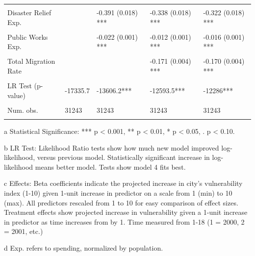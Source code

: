 \documentclass[]{elsarticle} %
\begin{document}
\begin{table}
\begin{threeparttable}
\begin{tabular}[t]{lllll}
\addlinespace
\cellcolor{gray!6}{Financial Strength} & \cellcolor{gray!6}{} & \cellcolor{gray!6}{0.084 (0.002) ***} & \cellcolor{gray!6}{0.090 (0.002) ***} & \cellcolor{gray!6}{0.089 (0.003) ***}\\
Disaster Relief Exp. &  & -0.391 (0.018) *** & -0.338 (0.018) *** & -0.322 (0.018) ***\\
\cellcolor{gray!6}{Emergency Services Exp.} & \cellcolor{gray!6}{} & \cellcolor{gray!6}{-0.040 (0.001) ***} & \cellcolor{gray!6}{-0.045 (0.001) ***} & \cellcolor{gray!6}{-0.044 (0.001) ***}\\
Public Works Exp. &  & -0.022 (0.001) *** & -0.012 (0.001) *** & -0.016 (0.001) ***\\
\cellcolor{gray!6}{Disaster Conditions} & \cellcolor{gray!6}{} & \cellcolor{gray!6}{} & \cellcolor{gray!6}{0.042 (0.008) ***} & \cellcolor{gray!6}{0.051 (0.008) ***}\\
\addlinespace
Total Migration Rate &  &  & -0.171 (0.004) *** & -0.170 (0.004) ***\\
\cellcolor{gray!6}{Constant} & \cellcolor{gray!6}{6.223 (0.047) ***} & \cellcolor{gray!6}{7.256 (0.047) ***} & \cellcolor{gray!6}{7.458 (0.046) ***} & \cellcolor{gray!6}{7.572 (0.046) ***}\\
\midrule
LR Test (p-value) & -17335.7 & -13606.2*** & -12593.5*** & -12286***\\
\cellcolor{gray!6}{R2} & \cellcolor{gray!6}{0.141} & \cellcolor{gray!6}{0.323} & \cellcolor{gray!6}{0.366} & \cellcolor{gray!6}{0.378}\\
Num. obs. & 31243 & 31243 & 31243 & 31243\\
\addlinespace
\cellcolor{gray!6}{F statistic} & \cellcolor{gray!6}{212.995} & \cellcolor{gray!6}{532.373} & \cellcolor{gray!6}{599.811} & \cellcolor{gray!6}{499.149}\\
\bottomrule
\end{tabular}
\begin{tablenotes}
\item[a] Statistical Significance: *** p < 0.001, ** p < 0.01, * p < 0.05, . p < 0.10.
\item[b] LR Test: Likelihood Ratio tests show how much new model improved log-likelihood, versus previous model. Statistically significant increase in log-likelihood means better model. Tests show model 4 fits best.
\item[c] Effects: Beta coefficients indicate the projected increase in city's vulnerability index (1-10) given 1-unit increase in predictor on a scale from 1 (min) to 10 (max). All predictors rescaled from 1 to 10 for easy comparison of effect sizes. Treatment effects show projected increase in vulnerability given a 1-unit increase in predictor as time increases from by 1. Time measured from 1-18 (1 = 2000, 2 = 2001, etc.)
\item[d] Exp. refers to spending, normalized by population.
\end{tablenotes}
\end{threeparttable}
\end{table}
\end{document}
